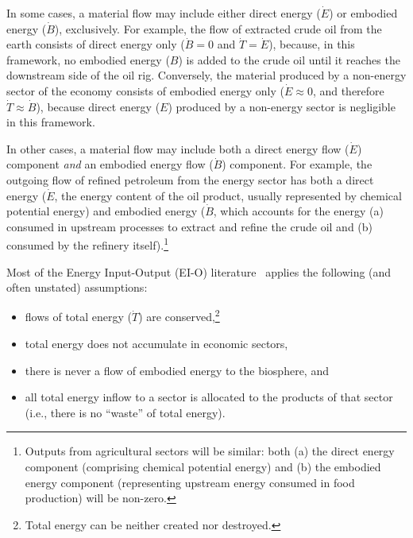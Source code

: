 In some cases, a material flow may include 
either direct energy ($\dot{E}$) 
or embodied energy ($\dot{B}$), exclusively. 
For example, the flow of extracted crude oil from the earth 
consists of direct energy only ($\dot{B} = 0$ and $\dot{T} = \dot{E}$), 
because, in this framework, no embodied energy ($B$) is added 
to the crude oil until it reaches the downstream side of the oil rig.
Conversely, the material produced by a non-energy sector of the economy 
consists of embodied energy only ($\dot{E} \approx 0$, 
and therefore $\dot{T} \approx \dot{B}$), 
because direct energy ($E$) produced by 
a non-energy sector is negligible in this framework. 

In other cases, a material flow may include both a direct energy flow
($\dot{E}$) component \emph{and} an embodied energy flow ($\dot{B}$) component.
For example, the outgoing flow of refined petroleum from the energy sector 
has both a direct energy ($\dot{E}$, the energy content of the oil product, 
usually represented by chemical potential energy) 
and embodied energy ($\dot{B}$, which accounts for the energy 
(a) consumed in upstream processes 
to extract and refine the crude oil and 
(b) consumed by the refinery itself).\footnote{Outputs from 
	agricultural sectors will be similar: 
	both (a) the direct energy component (comprising chemical potential energy) 
	and (b) the embodied energy component (representing upstream
	energy consumed in food production) will be non-zero.}

Most of the Energy Input-Output (EI-O) literature~\cite{Bullard1975, Herendeen1978} 
applies the following (and often unstated) assumptions:

\begin{itemize}
	\item{flows of total energy ($\dot{T}$) are 
	conserved,\footnote{Total energy 
	can be neither created nor destroyed.}}

	\item{total energy does not accumulate in economic 
	sectors,}
	
	\item{there is never a flow of embodied energy to the biosphere, and}

	\item{all total energy inflow to a sector
	is allocated to the products of that sector (i.e., 
	there is no ``waste'' of total energy).}	
\end{itemize}

